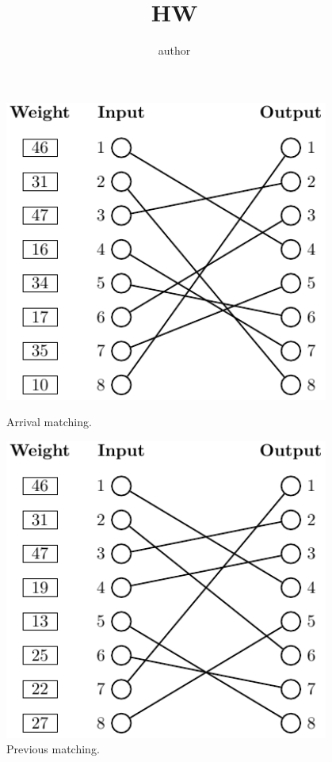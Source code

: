 \documentclass{article}
\title{HW}
\author{author}
\begin{document}
\maketitle


\lipsum
\begin{figure}[!htb]
\centering
\begin{minipage}{.48\textwidth}
\centering
\includegraphics[width=0.95\textwidth]{arrival_matching}
\caption{Arrival matching.}
\end{minipage}%
\hspace{.03\textwidth}
\begin{minipage}{.48\textwidth}
\centering
\includegraphics[width=0.95\textwidth]{previous_matching}
\caption{Previous matching.}
\end{minipage}
\end{figure}
\end{document}
